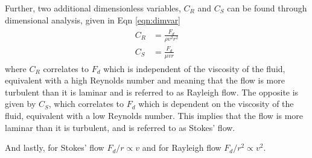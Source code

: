 \documentclass[11pt,a4paper]{article}
\begin{document}
    Further, two additional dimensionless variables, $C_R$ and $C_S$ can be found \cite{question_paper} through dimensional analysis, given in Eqn \ref{eqn:dimvar}
    \begin{align}
      \begin{split}
        C_R &= \frac{F_d}{\rho v^2 r^2} \\
        C_S &= \frac{F_d}{\mu v r}
      \end{split}
      \label{eqn:dimvar}
    \end{align}
    where $C_R$ correlates to $F_d$ which is independent of the viscosity of the fluid, equivalent with a high Reynolds number and meaning that the flow is more turbulent than it is laminar and is referred to as Rayleigh flow. The opposite is given by $C_S$, which correlates to $F_d$ which is dependent on the viscosity of the fluid, equivalent with a low Reynolds number. This implies that the flow is more laminar than it is turbulent, and is referred to as Stokes' flow.

    And lastly, for Stokes' flow $F_d/r \propto v$ and for Rayleigh flow $F_d / r^2 \propto v^2$. \cite{question_paper}
    
\end{document}
